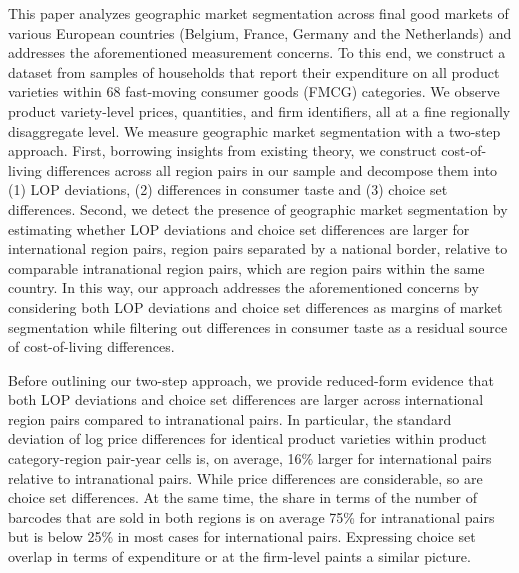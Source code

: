 This paper analyzes geographic market segmentation across final good markets of various European countries (Belgium, France, Germany and the Netherlands) and addresses the aforementioned measurement concerns. To this end, we construct a dataset from samples of households that report their expenditure on all product varieties within 68 fast-moving consumer goods (FMCG) categories. We observe product variety-level prices, quantities, and firm identifiers, all at a fine regionally disaggregate level. We measure geographic market segmentation with a two-step approach. First, borrowing insights from existing theory, we construct cost-of-living differences across all region pairs in our sample and decompose them into (1) LOP deviations, (2) differences in consumer taste and (3) choice set differences. Second, we detect the presence of geographic market segmentation by estimating whether LOP deviations and choice set differences are larger for international region pairs, region pairs separated by a national border, relative to comparable intranational region pairs, which are region pairs within the same country. In this way, our approach addresses the aforementioned concerns by considering both LOP deviations and choice set differences as margins of market segmentation while filtering out differences in consumer taste as a residual source of cost-of-living differences.

Before outlining our two-step approach, we provide reduced-form evidence that both LOP deviations and choice set differences are larger across international region pairs compared to intranational pairs. In particular, the standard deviation of log price differences for identical product varieties within product category-region pair-year cells is, on average, 16\% larger for international pairs relative to intranational pairs. While price differences are considerable, so are choice set differences. At the same time, the share in terms of the number of barcodes that are sold in both regions is on average 75\% for intranational pairs but is below 25\% in most cases for international pairs. Expressing choice set overlap in terms of expenditure or at the firm-level paints a similar picture.


